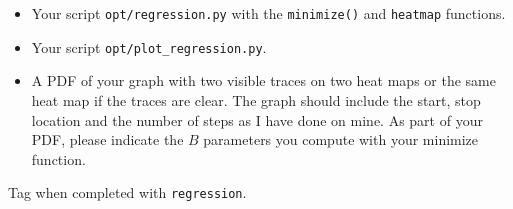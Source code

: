 \begin{fullwidth}
\begin{callout}{\bcplume}
\begin{itemize}
\item Your script {\tt opt/regression.py} with the {\tt minimize()} and {\tt heatmap} functions.
\item Your script {\tt opt/plot\_regression.py}.
\item A PDF of your graph with two visible traces on two heat maps or the same heat map if the traces are clear. The graph should include the start, stop location and the number of steps as I have done on mine. As part of your PDF, please indicate the $B$ parameters you compute with your minimize function.
\end{itemize}
Tag when completed with {\tt regression}.
\end{callout}

\end{fullwidth}

